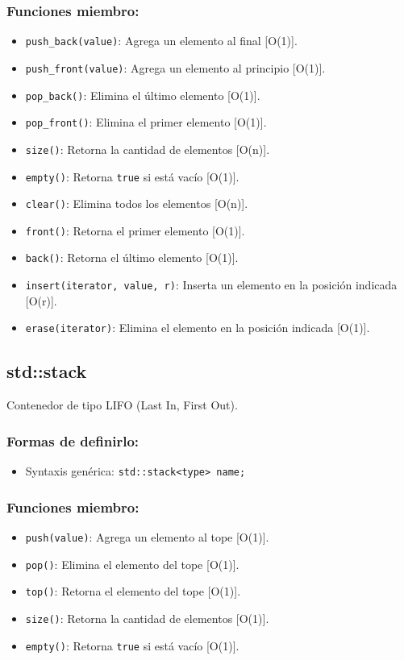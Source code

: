 \subsubsection{Funciones miembro:}
\begin{itemize}
  \item \texttt{push\_back(value)}: Agrega un elemento al final [O(1)].
  \item \texttt{push\_front(value)}: Agrega un elemento al principio [O(1)].
  \item \texttt{pop\_back()}: Elimina el último elemento [O(1)].
  \item \texttt{pop\_front()}: Elimina el primer elemento [O(1)].
  \item \texttt{size()}: Retorna la cantidad de elementos [O(n)].
  \item \texttt{empty()}: Retorna \texttt{true} si está vacío [O(1)].
  \item \texttt{clear()}: Elimina todos los elementos [O(n)].
  \item \texttt{front()}: Retorna el primer elemento [O(1)].
  \item \texttt{back()}: Retorna el último elemento [O(1)].
  \item \texttt{insert(iterator, value, r)}: Inserta un elemento en la posición indicada [O(r)].
  \item \texttt{erase(iterator)}: Elimina el elemento en la posición indicada [O(1)]. 
\end{itemize}

\subsection{std::stack}
\label{subsec:std_stack}
Contenedor de tipo LIFO (Last In, First Out). 

\subsubsection{Formas de definirlo:}
\begin{itemize}
  \item Syntaxis genérica: \texttt{std::stack<type> name;}
\end{itemize}

\subsubsection{Funciones miembro:}
\begin{itemize}
  \item \texttt{push(value)}: Agrega un elemento al tope [O(1)].
  \item \texttt{pop()}: Elimina el elemento del tope [O(1)].
  \item \texttt{top()}: Retorna el elemento del tope [O(1)].
  \item \texttt{size()}: Retorna la cantidad de elementos [O(1)].
  \item \texttt{empty()}: Retorna \texttt{true} si está vacío [O(1)]. 
\end{itemize}

